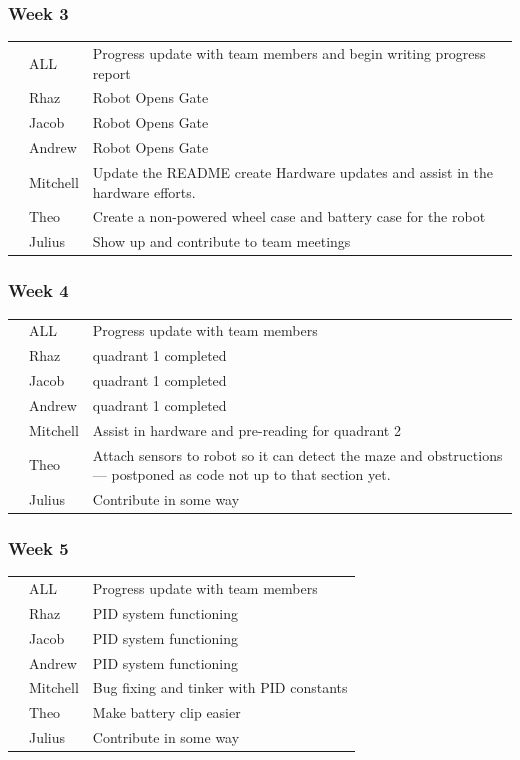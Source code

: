 \documentclass[paper=a4, fontsize=11pt]{scrartcl} %
\def\checkmark{\tikz\fill[scale=0.4] (0,.35) -- (.25,0) -- (1,.7) -- (.25,.15) -- cycle;}
\def\scalecheck{\resizebox{\widthof{\checkmark}*\ratio{\widthof{x}}{\widthof{\normalsize x}}}{!}{\checkmark}}
\numberwithin{equation}{section} %
\numberwithin{figure}{section} %
\begin{document}
\subsubsection*{Week 3}
\begin{tabularx}{\textwidth}{clX}
  \scalecheck & ALL      & Progress update with team members and begin writing progress report\\
  \scalecheck & Rhaz     & Robot Opens Gate\\
  \scalecheck & Jacob    & Robot Opens Gate\\
  \scalecheck & Andrew   & Robot Opens Gate\\
  \scalecheck & Mitchell & Update the README create Hardware updates and assist in the hardware efforts.\\
  \scalecheck & Theo     & Create a non-powered wheel case and battery case for the robot\\
              & Julius   & Show up and contribute to team meetings\\
\end{tabularx}

\subsubsection*{Week 4}
\begin{tabularx}{\textwidth}{clX}
  \scalecheck & ALL      & Progress update with team members\\
  \scalecheck & Rhaz     & quadrant 1 completed\\
  \scalecheck & Jacob    & quadrant 1 completed\\
  \scalecheck & Andrew   & quadrant 1 completed\\
  \scalecheck & Mitchell & Assist in hardware and pre-reading for quadrant 2\\

              & Theo     & Attach sensors to robot so it can detect the maze and obstructions --- postponed as code not up to that section yet.\\
              & Julius   & Contribute in some way\\
\end{tabularx}

\subsubsection*{Week 5}
\begin{tabularx}{\textwidth}{clX}
  \scalecheck & ALL      & Progress update with team members\\
  \scalecheck & Rhaz     & PID system functioning\\
  \scalecheck & Jacob    & PID system functioning\\
  \scalecheck & Andrew   & PID system functioning\\
  \scalecheck & Mitchell & Bug fixing and tinker with PID constants\\
  \scalecheck & Theo     & Make battery clip easier\\
              & Julius   & Contribute in some way\\
\end{tabularx}
\end{document}
